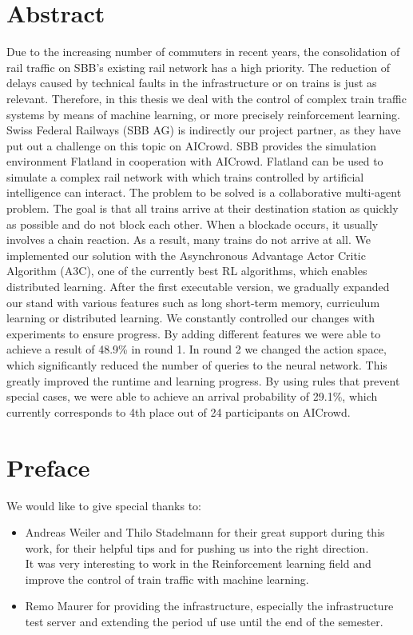 \chapter*{Abstract}\label{abstract}
Due to the increasing number of commuters in recent years, the consolidation of rail traffic on SBB's existing rail network has a high priority.
The reduction of delays caused by technical faults in the infrastructure or on trains is just as relevant.
Therefore, in this thesis we deal with the control of complex train traffic systems by means of machine learning, or more precisely reinforcement learning.
Swiss Federal Railways (SBB AG) is indirectly our project partner, as they have put out a challenge on this topic on AICrowd.
SBB provides the simulation environment Flatland in cooperation with AICrowd. Flatland can be used to simulate a complex rail network with which trains controlled by artificial intelligence can interact.
The problem to be solved is a collaborative multi-agent problem. The goal is that all trains arrive at their destination station as quickly as possible and do not block each other. When a blockade occurs, it usually involves a chain reaction. As a result, many trains do not arrive at all.
We implemented our solution with the Asynchronous Advantage Actor Critic Algorithm (A3C), one of the currently best RL algorithms, which enables distributed learning.
After the first executable version, we gradually expanded our stand with various features such as long short-term memory, curriculum learning or distributed learning.
We constantly controlled our changes with experiments to ensure progress.
By adding different features we were able to achieve a result of 48.9\% in round 1.
In round 2 we changed the action space, which significantly reduced the number of queries to the neural network. This greatly improved the runtime and learning progress.
By using rules that prevent special cases, we were able to achieve an arrival probability of 29.1\%, which currently corresponds to 4th place out of 24 participants on AICrowd.


\chapter*{Preface}\label{preface}
We would like to give special thanks to:
\begin{itemize}
    \item Andreas Weiler and Thilo Stadelmann for their great support during this work, for their helpful tips and for pushing us into the right direction.\\It was very interesting to work in the Reinforcement learning field and improve the control of train traffic with machine learning.
    \item Remo Maurer for providing the infrastructure, especially the infrastructure test server and extending the period uf use until the end of the semester.
\end{itemize}

